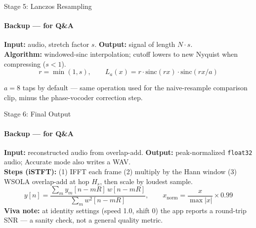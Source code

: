 \documentclass[aspectratio=169]{beamer}
\begin{document}
\begin{frame}{Stage 5: Lanczos Resampling}
  \framesubtitle{Backup --- for Q\&A}
  \textbf{Input:} audio, stretch factor $s$. \quad \textbf{Output:} signal of length $N\!\cdot\! s$.\\[4pt]
  \textbf{Algorithm:} windowed-sinc interpolation; cutoff lowers to new Nyquist when compressing ($s<1$).
  \[ r=\min(1,s), \qquad L_a(x)=r\cdot\mathrm{sinc}(rx)\cdot\mathrm{sinc}(rx/a) \]
  \centering
  \small $a=8$ taps by default --- same operation used for the naive-resample comparison clip, minus the phase-vocoder correction step.
\end{frame}

\begin{frame}{Stage 6: Final Output}
  \framesubtitle{Backup --- for Q\&A}
  \textbf{Input:} reconstructed audio from overlap-add. \quad
  \textbf{Output:} peak-normalized \texttt{float32} audio; Accurate mode also writes a WAV.\\[4pt]
  \textbf{Steps (iSTFT):} (1) IFFT each frame \; (2) multiply by the Hann window \; (3) WSOLA overlap-add at hop $H_s$, then scale by loudest sample.
  \[ y[n]=\frac{\sum_m y_m[n-mR]\,w[n-mR]}{\sum_m w^2[n-mR]}, \qquad
     x_{\text{norm}}=\frac{x}{\max|x|}\times0.99 \]
  \small\textbf{Viva note:} at identity settings (speed 1.0, shift 0) the app reports a round-trip SNR --- a sanity check, not a general quality metric.
\end{frame}

\end{document}
